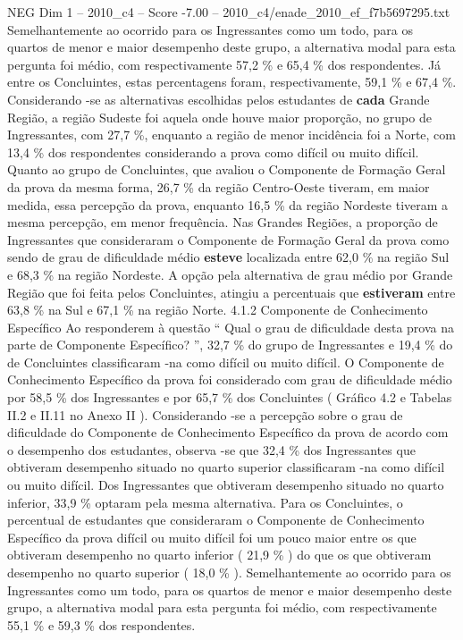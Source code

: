 \begin{textsample}{NEG Dim 1 – 2010\_c4 – Score -7.00 – 2010\_c4/enade\_2010\_ef\_f7b5697295.txt}
Semelhantemente ao ocorrido para os Ingressantes como um todo, para os quartos de menor e maior desempenho deste grupo, a alternativa modal para esta pergunta foi médio, com respectivamente 57,2 \% e 65,4 \% dos respondentes.
Já entre os Concluintes, estas percentagens foram, respectivamente, 59,1 \% e 67,4 \%.
Considerando -se as alternativas escolhidas pelos estudantes de \textbf{cada} Grande Região, a região Sudeste foi aquela onde houve maior proporção, no grupo de Ingressantes, com 27,7 \%, enquanto a região de menor incidência foi a Norte, com 13,4 \% dos respondentes considerando a prova como difícil ou muito difícil.
Quanto ao grupo de Concluintes, que avaliou o Componente de Formação Geral da prova da mesma forma, 26,7 \% da região Centro-Oeste tiveram, em maior medida, essa percepção da prova, enquanto 16,5 \% da região Nordeste tiveram a mesma percepção, em menor frequência.
Nas Grandes Regiões, a proporção de Ingressantes que consideraram o Componente de Formação Geral da prova como sendo de grau de dificuldade médio \textbf{esteve} localizada entre 62,0 \% na região Sul e 68,3 \% na região Nordeste.
A opção pela alternativa de grau médio por Grande Região que foi feita pelos Concluintes, atingiu a percentuais que \textbf{estiveram} entre 63,8 \% na Sul e 67,1 \% na região Norte. 4.1.2 Componente de Conhecimento Específico Ao responderem à questão “ Qual o grau de dificuldade desta prova na parte de Componente Específico? ”, 32,7 \% do grupo de Ingressantes e 19,4 \% do de Concluintes classificaram -na como difícil ou muito difícil.
O Componente de Conhecimento Específico da prova foi considerado com grau de dificuldade médio por 58,5 \% dos Ingressantes e por 65,7 \% dos Concluintes ( Gráfico 4.2 e Tabelas II.2 e II.11 no Anexo II ).
Considerando -se a percepção sobre o grau de dificuldade do Componente de Conhecimento Específico da prova de acordo com o desempenho dos estudantes, observa -se que 32,4 \% dos Ingressantes que obtiveram desempenho situado no quarto superior classificaram -na como difícil ou muito difícil.
Dos Ingressantes que obtiveram desempenho situado no quarto inferior, 33,9 \% optaram pela mesma alternativa.
Para os Concluintes, o percentual de estudantes que consideraram o Componente de Conhecimento Específico da prova difícil ou muito difícil foi um pouco maior entre os que obtiveram desempenho no quarto inferior ( 21,9 \% ) do que os que obtiveram desempenho no quarto superior ( 18,0 \% ).
Semelhantemente ao ocorrido para os Ingressantes como um todo, para os quartos de menor e maior desempenho deste grupo, a alternativa modal para esta pergunta foi médio, com respectivamente 55,1 \% e 59,3 \% dos respondentes.

\end{textsample}
